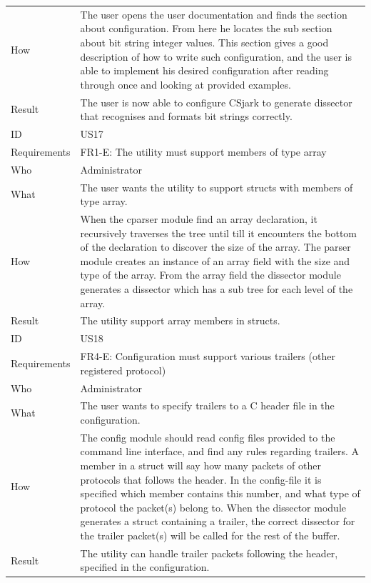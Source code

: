 \begin{table}[htbp]
{\begin{tabularx}{1.2\textwidth}{l X}
	How & The user opens the user documentation and finds the section about configuration. From here he locates the sub section about bit string
	 integer values. This section gives a good description of how to write such configuration, and the user is able to implement his desired configuration
	 after reading through once and looking at provided examples.  \\
	Result & The user is now able to configure CSjark to generate dissector that recognises and formats bit strings correctly. \\
	\midrule
	ID & US17 \\
	Requirements & FR1-E: The utility must support members of type array \\
	Who & Administrator \\
	What & The user wants the utility to support structs with members of type array. \\
	How & When the cparser module find an array declaration, it recursively traverses the tree until till it encounters the bottom of the declaration 
	to discover the size of the array. The parser module creates an instance of an array field with the size and type of the array. From the array field
	the dissector module generates a dissector which has a sub tree for each level of the array. \\
	Result & The utility support array members in structs. \\
	\midrule
	ID & US18 \\
	Requirements & FR4-E: Configuration must support various trailers (other registered protocol) \\
	Who & Administrator \\
	What & The user wants to specify trailers to a C header file in the configuration. \\
	How & The config module should read config files provided to the command line interface, and find any rules regarding trailers. A member in a struct
	will say how many packets of other protocols that follows the header. In the config-file it is specified which member contains this number, and what
 	type of protocol the packet(s) belong to. When the dissector module generates a struct containing a trailer, the correct dissector for the trailer packet(s) 
	will be called for the rest of the buffer. \\
	Result & The utility can handle trailer packets following the header, specified in the configuration. \\
	\bottomrule
\end{tabularx}}
\end{table}

